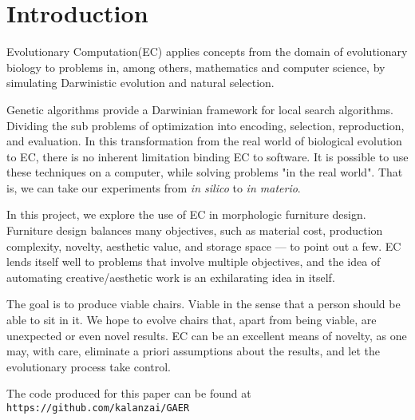 \section{Introduction}
Evolutionary Computation(EC) applies concepts from the domain of evolutionary
biology to problems in, among others, mathematics and computer science,
by simulating Darwinistic evolution and natural selection.

Genetic algorithms provide a Darwinian framework for local search algorithms.
Dividing the sub problems of optimization into encoding, selection,
reproduction, and evaluation. In this transformation from the real world of
biological evolution to EC, there is no inherent limitation binding EC to
software. It is possible to use these techniques on a computer, while solving
problems "in the real world". That is, we can take our experiments from
\emph{in silico} to \emph{in materio}\cite{paper:ev3}.

In this project, we explore the use of EC in morphologic furniture design.
Furniture design balances many objectives, such as material cost, production
complexity, novelty, aesthetic value, and storage space --- to point out a few.
EC lends itself well to problems that involve multiple objectives, and the idea
of automating creative/aesthetic work is an exhilarating idea in itself.

The goal is to produce viable chairs. Viable in the sense that a person should 
be able to sit in it. We hope to evolve chairs that, apart from being viable,
are unexpected or even novel results. EC can be an excellent means of novelty,
as one may, with care, eliminate a priori assumptions about the results, and let
the evolutionary process take control.

The code produced for this paper can be found at
\texttt{https://github.com/kalanzai/GAER}
